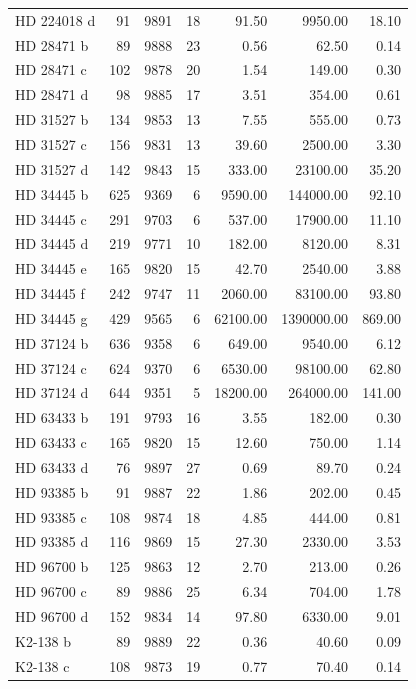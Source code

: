 \begin{table}
\begin{tabular}{lrrrrrr}
HD 224018 d & 91 & 9891 & 18 & 91.50 & 9950.00 & 18.10 \\
HD 28471 b & 89 & 9888 & 23 & 0.56 & 62.50 & 0.14 \\
HD 28471 c & 102 & 9878 & 20 & 1.54 & 149.00 & 0.30 \\
HD 28471 d & 98 & 9885 & 17 & 3.51 & 354.00 & 0.61 \\
HD 31527 b & 134 & 9853 & 13 & 7.55 & 555.00 & 0.73 \\
HD 31527 c & 156 & 9831 & 13 & 39.60 & 2500.00 & 3.30 \\
HD 31527 d & 142 & 9843 & 15 & 333.00 & 23100.00 & 35.20 \\
HD 34445 b & 625 & 9369 & 6 & 9590.00 & 144000.00 & 92.10 \\
HD 34445 c & 291 & 9703 & 6 & 537.00 & 17900.00 & 11.10 \\
HD 34445 d & 219 & 9771 & 10 & 182.00 & 8120.00 & 8.31 \\
HD 34445 e & 165 & 9820 & 15 & 42.70 & 2540.00 & 3.88 \\
HD 34445 f & 242 & 9747 & 11 & 2060.00 & 83100.00 & 93.80 \\
HD 34445 g & 429 & 9565 & 6 & 62100.00 & 1390000.00 & 869.00 \\
HD 37124 b & 636 & 9358 & 6 & 649.00 & 9540.00 & 6.12 \\
HD 37124 c & 624 & 9370 & 6 & 6530.00 & 98100.00 & 62.80 \\
HD 37124 d & 644 & 9351 & 5 & 18200.00 & 264000.00 & 141.00 \\
HD 63433 b & 191 & 9793 & 16 & 3.55 & 182.00 & 0.30 \\
HD 63433 c & 165 & 9820 & 15 & 12.60 & 750.00 & 1.14 \\
HD 63433 d & 76 & 9897 & 27 & 0.69 & 89.70 & 0.24 \\
HD 93385 b & 91 & 9887 & 22 & 1.86 & 202.00 & 0.45 \\
HD 93385 c & 108 & 9874 & 18 & 4.85 & 444.00 & 0.81 \\
HD 93385 d & 116 & 9869 & 15 & 27.30 & 2330.00 & 3.53 \\
HD 96700 b & 125 & 9863 & 12 & 2.70 & 213.00 & 0.26 \\
HD 96700 c & 89 & 9886 & 25 & 6.34 & 704.00 & 1.78 \\
HD 96700 d & 152 & 9834 & 14 & 97.80 & 6330.00 & 9.01 \\
K2-138 b & 89 & 9889 & 22 & 0.36 & 40.60 & 0.09 \\
K2-138 c & 108 & 9873 & 19 & 0.77 & 70.40 & 0.14 \\

\end{tabular}
\end{table}
